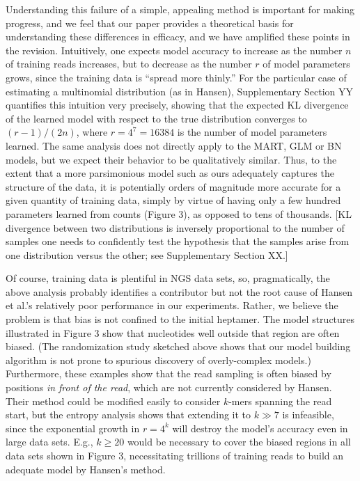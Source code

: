 \documentclass{article}
\begin{document}
Understanding this failure of a simple, appealing method is important
for making progress, and we feel that our paper provides a theoretical
basis for understanding these differences in efficacy, and we have
amplified these points in the revision.  Intuitively, one expects
model accuracy to increase as the number $n$ of training reads
increases, but to decrease as the number $r$ of model parameters
grows, since the training data is ``spread more thinly.''  For the
particular case of estimating a multinomial distribution (as in
Hansen), Supplementary Section YY quantifies this intuition very
precisely, showing that the expected KL divergence of the learned
model with respect to the true distribution converges to $(r-1)/(2n)$,
where $r=4^7=16384$ is the number of model parameters learned.  The
same analysis does not directly apply to the MART, GLM or BN models,
but we expect their behavior to be qualitatively similar.  Thus, to
the extent that a more parsimonious model such as ours adequately
captures the structure of the data, it is potentially orders of
magnitude more accurate for a given quantity of training data, simply
by virtue of having only a few hundred parameters learned from counts
(Figure 3), as opposed to tens of thousands.  [KL divergence between
two distributions is inversely proportional to the number of samples
one needs to confidently test the hypothesis that the samples arise
from one distribution versus the other; see Supplementary Section XX.]

Of course, training data is plentiful in NGS data sets, so,
pragmatically, the above analysis probably identifies a contributor
but not the root cause of Hansen et al.'s relatively poor performance
in our experiments.  Rather, we believe the problem is that bias is
not confined to the initial heptamer.  The model structures
illustrated in Figure 3 show that nucleotides well outside that region
are often biased.  (The randomization study sketched above shows that
our model building algorithm is not prone to spurious discovery of
overly-complex models.)  Furthermore, these examples show that the
read sampling is often biased by positions \emph{in front of the
  read}, which are not currently considered by Hansen.  Their method
could be modified easily to consider $k$-mers spanning the read start,
but the entropy analysis shows that extending it to $k \gg 7$ is
infeasible, since the exponential growth in $r=4^k$ will destroy the
model's accuracy even in large data sets.  E.g., $k \ge 20$ would be
necessary to cover the biased regions in all data sets shown in Figure
3, necessitating trillions of training reads to build an adequate
model by Hansen's method.
\end{document}
